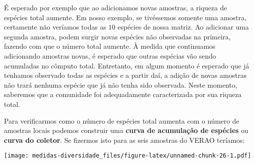 \documentclass[
]{book}
\newenvironment{Shaded}{\begin{snugshade}}{\end{snugshade}}
\newcommand{\AttributeTok}[1]{\textcolor[rgb]{0.77,0.63,0.00}{#1}}
\newcommand{\DecValTok}[1]{\textcolor[rgb]{0.00,0.00,0.81}{#1}}
\newcommand{\FunctionTok}[1]{\textcolor[rgb]{0.00,0.00,0.00}{#1}}
\newcommand{\NormalTok}[1]{#1}
\newcommand{\OtherTok}[1]{\textcolor[rgb]{0.56,0.35,0.01}{#1}}
\newcommand{\SpecialCharTok}[1]{\textcolor[rgb]{0.00,0.00,0.00}{#1}}
\newcommand{\StringTok}[1]{\textcolor[rgb]{0.31,0.60,0.02}{#1}}
\begin{document}
É esperado por exemplo que ao adicionamos novas amostras, a riqueza de espécies total aumente. Em nosso exemplo, se tivéssemos somente uma amostra, certamente não veríamos todas as \(10\) espécies de nossa matriz. Ao adicionar uma segunda amostra, podem surgir novas espécies não observadas na primeira, fazendo com que o número total aumente. À medida que continuamos adicionando amostras novas, é esperado que outras espécias vão sendo acumuladas no cômputo total. Entretanto, em algum momento é esperado que já tenhamos observado todas as espécies e a partir daí, a adição de novas amostras não trará nenhuma espécie que já não tenha sido observada. Neste momento, saberemos que a comunidade foi adequadamente caracterizada por sua riqueza total.

Para verificarmos como o número de espécies total aumenta com o número de amostras locais podemos construir uma \textbf{curva de acumulação de espécies} ou \textbf{curva do coletor}. Se fizermos isto para as seis amostras do VERAO teríamos:

\begin{Shaded}
\end{Shaded}

\texttt{[image: medidas-diversidade\_files/figure-latex/unnamed-chunk-26-1.pdf]}
\end{document}

